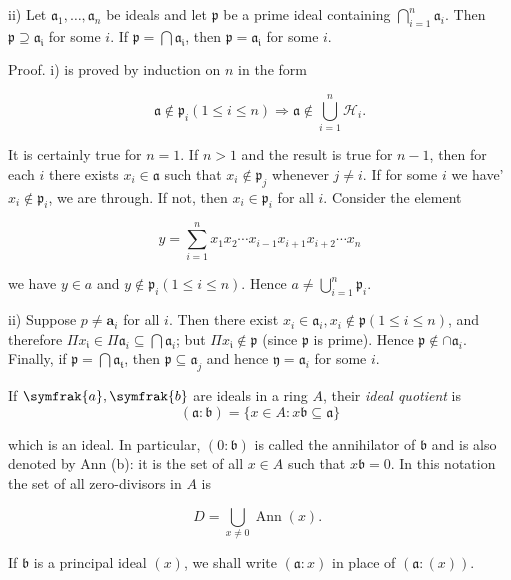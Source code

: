\documentclass{standalone}
\theoremstyle{definition}
\theoremstyle{remark}
\begin{document}
ii) Let $\mathfrak{a}_{1}, \ldots, \mathfrak{a}_{n}$ be ideals and let $\mathfrak{p}$ be a prime ideal containing $\bigcap_{i=1}^{n} \mathfrak{a}_{i}$. Then $\mathfrak{p} \supseteq \mathfrak{a}_{\mathfrak{i}}$ for some $i$. If $\mathfrak{p}=\bigcap \mathfrak{a}_{\mathfrak{i}}$, then $\mathfrak{p}=\mathfrak{a}_{\mathfrak{i}}$ for some $i$.

Proof. i) is proved by induction on $n$ in the form

\[
\mathfrak{a} \notin \mathfrak{p}_{i}(1 \leqslant i \leqslant n) \Rightarrow \mathfrak{a} \notin \bigcup_{i=1}^{n} \mathcal{H}_{i} .
\]

It is certainly true for $n=1$. If $n>1$ and the result is true for $n-1$, then for each $i$ there exists $x_{i} \in \mathfrak{a}$ such that $x_{i} \notin \mathfrak{p}_{j}$ whenever $j \neq i$. If for some $i$ we have' $x_{i} \notin \mathfrak{p}_{i}$, we are through. If not, then $x_{i} \in \mathfrak{p}_{i}$ for all $i$. Consider the element

\[
y=\sum_{i=1}^{n} x_{1} x_{2} \cdots x_{i-1} x_{i+1} x_{i+2} \cdots x_{n}
\]

we have $y \in a$ and $y \notin \mathfrak{p}_{i}(1 \leqslant i \leqslant n)$. Hence $a \neq \bigcup_{i=1}^{n} \mathfrak{p}_{i}$.

ii) Suppose $p \neq \boldsymbol{a}_{i}$ for all $i$. Then there exist $x_{i} \in \mathfrak{a}_{i}, x_{i} \notin \mathfrak{p}(1 \leqslant i \leqslant n)$, and therefore $\Pi x_{\mathfrak{i}} \in \Pi \mathfrak{a}_{i} \subseteq \bigcap \mathfrak{a}_{i}$; but $\Pi x_{\mathfrak{i}} \notin \mathfrak{p}$ (since $\mathfrak{p}$ is prime). Hence $\mathfrak{p} \notin \cap \mathfrak{a}_{i}$. Finally, if $\mathfrak{p}=\bigcap \mathfrak{a}_{\mathfrak{t}}$, then $\mathfrak{p} \subseteq \mathfrak{a}_{\dot{j}}$ and hence $\mathfrak{y}=\mathfrak{a}_{i}$ for some $i$.

If $\symfrak{a}, \symfrak{b}$ are ideals in a ring $A$, their \textit{ideal quotient} is
\[
(\mathfrak{a}: \mathfrak{b})=\{x \in A: x \mathfrak{b} \subseteq \mathfrak{a}\}
\]

which is an ideal. In particular, $(0: \mathfrak{b})$ is called the annihilator of $\mathfrak{b}$ and is also denoted by Ann (b): it is the set of all $x \in A$ such that $x \mathfrak{b}=0$. In this notation the set of all zero-divisors in $A$ is

\[
D=\bigcup_{x \neq 0} \operatorname{Ann}(x) \text {. }
\]

If $\mathfrak{b}$ is a principal ideal $(x)$, we shall write $(\mathfrak{a}: x)$ in place of $(\mathfrak{a}:(x))$.
\end{document}
